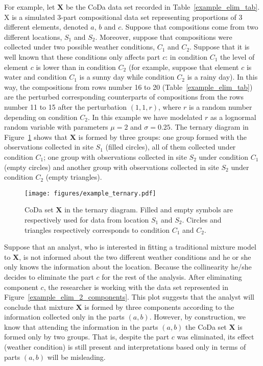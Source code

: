 \documentclass[12pt, a4paper]{article}
\begin{document}
For example, let $\mathbf{X}$ be the CoDa data set recorded in Table~\ref{example_elim_tab}. X is a simulated $3$-part compositional data set representing proportions of $3$ different elements, denoted $a$, $b$ and $c$. Suppose that compositions come from two different locations, $S_1$ and $S_2$. Moreover, suppose that compositions were collected under two possible weather conditions, $C_1$ and $C_2$. Suppose that it is well known
that these conditions only affects part $c$: in condition $C_1$ the level of element $c$ is lower than in condition $C_2$ (for example, suppose that element $c$ is water and condition $C_1$ is a sunny day while condition $C_2$ is a rainy day). In this way, the compositions from rows number 16 to 20 (Table~\ref{example_elim_tab}) are the perturbed corresponding counterparts of compositions from the
rows number 11 to 15 after the perturbation $(1,1,r)$, where $r$ is a random number depending on condition $C_2$. In this example we have modelated $r$ as a lognormal random variable with parameters $\mu=2$ and $\sigma=0.25$. 
The ternary diagram in Figure~\ref{example_elim_component} shows that $\mathbf{X}$ is formed by three groups: one group formed with the observations collected in site $S_1$ (filled circles), all of them collected under condition $C_1$; one group with observations collected in site $S_2$ under condition $C_1$ (empty circles) and another group with observations collected in site $S_2$ under condition $C_2$ (empty triangles).

\begin{figure}[thbp]
\centering
\texttt{[image: figures/example\_ternary.pdf]}
\caption{CoDa set $\mathbf{X}$ in the ternary diagram. Filled and empty symbols are respectively used for
data from location $S_1$ and $S_2$. Circles and triangles respectively corresponds to condition
$C_1$ and $C_2$. }\label{example_elim_component}
\end{figure}
Suppose that an analyst, who is interested in fitting a traditional mixture model to $\mathbf{X}$, is not informed about the two different weather conditions and he or she only knows the information about the location. Because 
the collinearity he/she decides to eliminate the part $c$ for the rest of the analysis. After eliminating component $c$, the researcher is working with the data set represented in Figure~\ref{example_elim_2_components}. This plot suggests that the analyst will conclude that mixture $\mathbf{X}$ is formed by three components according to the information collected only in the parts $(a, b)$. However, by construction, we know that attending the information in the parts $(a, b)$ the CoDa set $\mathbf{X}$ is formed only by two groups. That is, despite the part $c$ was eliminated, its effect (weather condition) is still present and interpretations based only in terms
of parts $(a, b)$ will be misleading.
\end{document}
